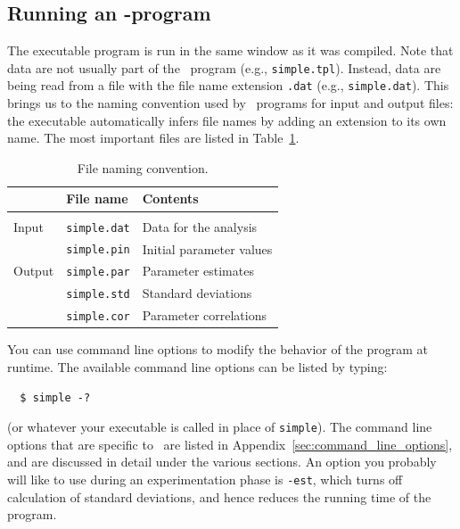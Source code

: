 \documentclass{admbmanual}
\begin{document}
\subsection{Running an \scAB-program}

The executable program is run in the same window as it was compiled. Note that
data are not usually part of the \scAB\ program (e.g., \texttt{simple.tpl}).
Instead, data are being read from a file with the file name
extension \texttt{.dat} (e.g., \texttt{simple.dat}). This brings us to the
naming convention used by \scAB\ programs for input and output files: the
executable automatically infers file names by adding an extension to its own
name. The most important files are listed in Table~\ref{tab:important-files}.
\begin{table}[htbp]
  \begin{center}
    \begin{tabular}{@{\vrule height 12pt depth 6pt width0pt} lll}
      \hline
      ~      & \textbf{File name}  & \textbf{Contents}       \\
      \hline\\[-17pt]
      Input  & \texttt{simple.dat} & Data for the analysis   \\
      ~      & \texttt{simple.pin} & Initial parameter values\\
      \hline
      Output & \texttt{simple.par} & Parameter estimates     \\
      ~      & \texttt{simple.std} & Standard deviations     \\
      ~      & \texttt{simple.cor} & Parameter correlations  \\
      \hline
    \end{tabular}
  \end{center}
  \caption{File naming convention.}
  \label{tab:important-files}
\end{table}
You can use command line options to modify the behavior of the program at
runtime. The available command line options can be listed by typing:
\begin{lstlisting}
  $ simple -?
\end{lstlisting}
(or whatever your executable is called in place of \texttt{simple}). The command
line options that are specific to \scAR\ are listed in
Appendix~\ref{sec:command_line_options}, and are discussed in detail under the
various sections. An option you probably will like to use during an
experimentation phase is \texttt{-est}, which turns off calculation of standard
deviations, and hence reduces the running time of the program.
\end{document}
